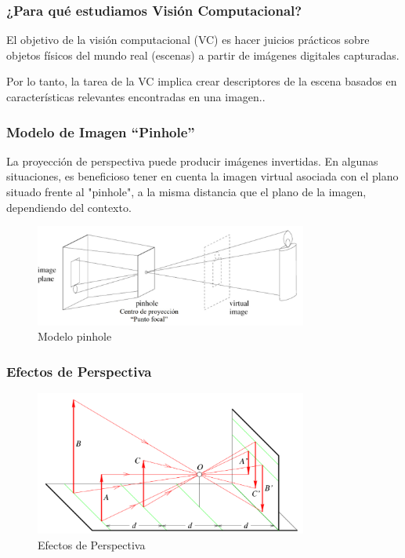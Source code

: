 \subsubsection{¿Para qué estudiamos Visión Computacional?}

El objetivo de la visión computacional (VC) es hacer juicios prácticos sobre objetos físicos del mundo real (escenas) a partir de imágenes digitales capturadas.

Por lo tanto, la tarea de la VC implica crear descriptores de la escena basados en características relevantes encontradas en una imagen..


\subsubsection{Modelo de Imagen “Pinhole”}

La proyección de perspectiva puede producir imágenes invertidas. En algunas situaciones, es beneficioso tener en cuenta la imagen virtual asociada con el plano situado frente al "pinhole", a la misma distancia que el plano de la imagen, dependiendo del contexto.


\begin{figure}[H]
	\begin{center}
		\includegraphics[width=0.8\textwidth]{2/figures/vc2.jpeg}
		\caption{Modelo pinhole}
		\label{}
	\end{center}
	
\end{figure}


\subsubsection{Efectos de Perspectiva}




\begin{figure}[H]
	\begin{center}
		\includegraphics[width=0.8\textwidth]{2/figures/vc3.png}
		\caption{Efectos de Perspectiva}
		\label{}
	\end{center}
	
\end{figure}

